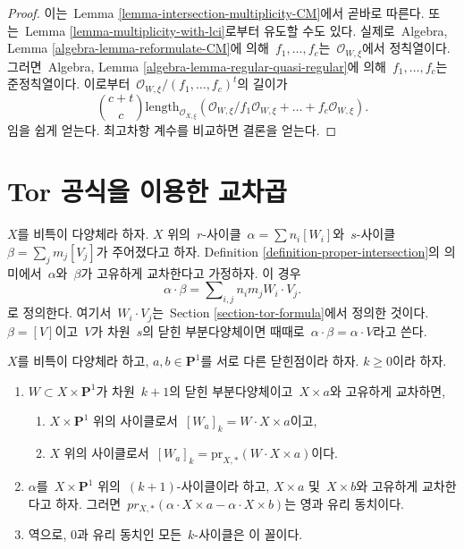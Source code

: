 \begin{proof}
이는\  Lemma \ref{lemma-intersection-multiplicity-CM}에서 곧바로 따른다.
또는\  Lemma \ref{lemma-multiplicity-with-lci}로부터 유도할 수도 있다.
실제로\  Algebra, Lemma \ref{algebra-lemma-reformulate-CM}에 의해\ 
$f_1, \ldots, f_c$는\  $\mathcal{O}_{W, \xi}$에서 정칙열이다.
그러면\  Algebra, Lemma \ref{algebra-lemma-regular-quasi-regular}에 의해\ 
$f_1, \ldots, f_c$는 준정칙열이다. 이로부터\ 
$\mathcal{O}_{W, \xi}/(f_1, \ldots, f_c)^t$의 길이가
$$
{c + t \choose c}
\text{length}_{\mathcal{O}_{X, \xi}} (\mathcal{O}_{W, \xi}/
f_1\mathcal{O}_{W, \xi} + \ldots + f_c\mathcal{O}_{W, \xi}).
$$
임을 쉽게 얻는다. 최고차항 계수를 비교하면 결론을 얻는다.
\end{proof}


\section{Tor 공식을 이용한 교차곱}
\label{section-intersection-product}

\noindent
$X$를 비특이 다양체라 하자. $X$ 위의\  $r$-사이클\ 
$\alpha = \sum n_i [W_i]$와\  $s$-사이클\ 
$\beta = \sum_j m_j [V_j]$가 주어졌다고 하자.
Definition \ref{definition-proper-intersection}의 의미에서\  $\alpha$와\ 
$\beta$가 고유하게 교차한다고 가정하자. 이 경우
$$
\alpha \cdot \beta = \sum\nolimits_{i,j} n_i m_j W_i \cdot V_j.
$$
로 정의한다. 여기서\  $W_i \cdot V_j$는\ 
Section \ref{section-tor-formula}에서 정의한 것이다.
$\beta = [V]$이고\  $V$가 차원\  $s$의 닫힌 부분다양체이면 때때로\ 
$\alpha \cdot \beta = \alpha \cdot V$라고 쓴다.

\begin{lemma}
\label{lemma-rational-equivalence-and-intersection}
$X$를 비특이 다양체라 하고, $a, b \in \mathbf{P}^1$를 서로 다른
닫힌점이라 하자. $k \geq 0$이라 하자.
\begin{enumerate}
\item $W \subset X \times \mathbf{P}^1$가 차원\  $k + 1$의 닫힌
부분다양체이고\  $X \times a$와 고유하게 교차하면,
\begin{enumerate}
\item $X \times \mathbf{P}^1$ 위의 사이클로서\ 
$[W_a]_k = W \cdot X \times a$이고,
\item $X$ 위의 사이클로서\ 
$[W_a]_k = \text{pr}_{X, *}(W \cdot X \times a)$이다.
\end{enumerate}
\item $\alpha$를\  $X \times \mathbf{P}^1$ 위의\  $(k + 1)$-사이클이라 하고,
$X \times a$ 및\  $X \times b$와 고유하게 교차한다고 하자. 그러면\ 
$pr_{X,*}( \alpha \cdot X \times a - \alpha \cdot X \times b)$는
영과 유리 동치이다.
\item 역으로, $0$과 유리 동치인 모든\  $k$-사이클은 이 꼴이다.
\end{enumerate}
\end{lemma}

